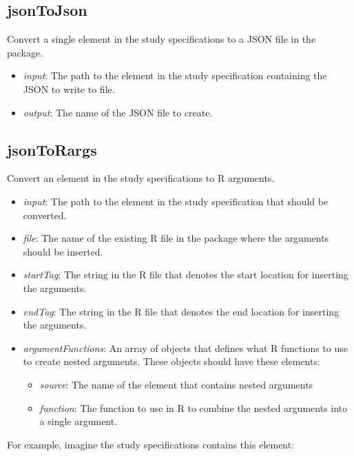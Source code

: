 \documentclass[]{article}
\providecommand{\tightlist}{%
  \setlength{\itemsep}{0pt}\setlength{\parskip}{0pt}}
\begin{document}
\hypertarget{jsontojson}{%
\subsection{jsonToJson}\label{jsontojson}}

Convert a single element in the study specifications to a JSON file in
the package.

\begin{itemize}
\tightlist
\item
  \emph{input}: The path to the element in the study specification
  containing the JSON to write to file.
\item
  \emph{output}: The name of the JSON file to create.
\end{itemize}

\hypertarget{jsontorargs}{%
\subsection{jsonToRargs}\label{jsontorargs}}

Convert an element in the study specifications to R arguments.

\begin{itemize}
\tightlist
\item
  \emph{input}: The path to the element in the study specification that
  should be converted.
\item
  \emph{file}: The name of the existing R file in the package where the
  arguments should be inserted.
\item
  \emph{startTag}: The string in the R file that denotes the start
  location for inserting the arguments.
\item
  \emph{endTag}: The string in the R file that denotes the end location
  for inserting the arguments.
\item
  \emph{argumentFunctions}: An array of objects that defines what R
  functions to use to create nested arguments. These objects should have
  these elements:

  \begin{itemize}
  \tightlist
  \item
    \emph{source}: The name of the element that contains nested
    arguments
  \item
    \emph{function}: The function to use in R to combine the nested
    arguments into a single argument.
  \end{itemize}
\end{itemize}

For example, imagine the study specifications contains this element:
\end{document}

